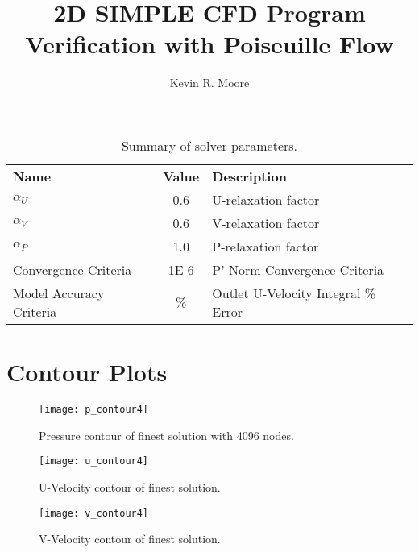 \documentclass[10pt,english]{article}
\title{\vspace{-20pt}2D SIMPLE CFD Program Verification with Poiseuille Flow}
\author{Kevin R. Moore}
\affil{\vspace{-10pt}Brigham Young University}
\date{}
\begin{document}
\maketitle
\vspace{0pt}

\begin{table*}[h]
\vspace{20pt}
\centering
  \begin{tabular}{lcl}
    \textbf{Name} & \textbf{Value} & \textbf{Description}  \\
    $\alpha_{U}$ & 0.6 & U-relaxation factor  \\
    $\alpha_{V}$ & 0.6 & V-relaxation factor  \\
    $\alpha_{P}$ & 1.0 & P-relaxation factor  \\
    Convergence Criteria  & 1E-6 & P' Norm Convergence Criteria  \\
    Model Accuracy Criteria  & \% & Outlet U-Velocity Integral \% Error  \\

  \end{tabular}
  \caption{Summary of solver parameters.}
  \label{tab:params}
\end{table*}

\vspace{0pt}

\section{Contour Plots}

\begin{figure}[htbp]
\centering
\texttt{[image: p\_contour4]}
\vspace{-5pt}
\caption{Pressure contour of finest solution with 4096 nodes.}
\label{f:3b}
\end{figure}

\begin{figure}[htbp]
\centering
\texttt{[image: u\_contour4]}
\vspace{-5pt}
\caption{U-Velocity contour of finest solution.}
\label{f:3b}
\end{figure}

\begin{figure}[htbp]
\centering
\texttt{[image: v\_contour4]}
\vspace{-5pt}
\caption{V-Velocity contour of finest solution.}
\label{f:3b}
\end{figure}
\end{document}
